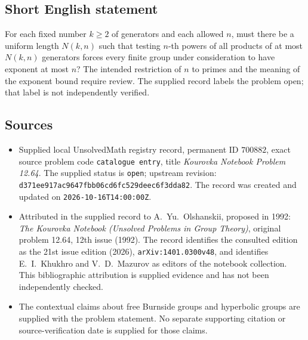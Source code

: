 \documentclass[11pt]{article}
\begin{document}
\subsection{Short English statement}
For each fixed number \(k\geq 2\) of generators and each allowed \(n\), must there be a uniform length \(N(k,n)\) such that testing \(n\)-th powers of all products of at most \(N(k,n)\) generators forces every finite group under consideration to have exponent at most \(n\)? The intended restriction of \(n\) to primes and the meaning of the exponent bound require review. The supplied record labels the problem open; that label is not independently verified.
\subsection{Sources}
\begin{itemize}
\item Supplied local UnsolvedMath registry record, permanent ID \(700882\), exact source problem code \texttt{catalogue entry}, title \emph{Kourovka Notebook Problem 12.64}. The supplied status is \texttt{open}; upstream revision: \texttt{d371ee917ac9647fbb06cd6fc529deec6f3dda82}. The record was created and updated on \texttt{2026-10-16T14:00:00Z}.
\item Attributed in the supplied record to A.\ Yu.\ Olshanskii, proposed in 1992: \emph{The Kourovka Notebook (Unsolved Problems in Group Theory)}, original problem 12.64, 12th issue (1992). The record identifies the consulted edition as the 21st issue edition (2026), \texttt{arXiv:1401.0300v48}, and identifies E.\ I.\ Khukhro and V.\ D.\ Mazurov as editors of the notebook collection. This bibliographic attribution is supplied evidence and has not been independently checked.
\item The contextual claims about free Burnside groups and hyperbolic groups are supplied with the problem statement. No separate supporting citation or source-verification date is supplied for those claims.
\end{itemize}
\end{document}
